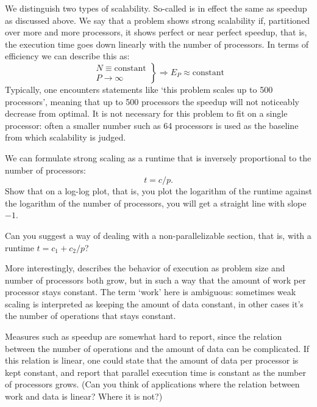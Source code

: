 We distinguish two types of scalability.
So-called
is in effect the same as speedup
as discussed above.
We say that a problem shows strong scalability if,
partitioned over more and more processors, it shows perfect or near
perfect speedup, that is, the execution time goes down linearly with
the number of processors. In terms of efficiency we can describe this
as:
\[ \left.
\begin{array}{l}
  N\equiv\mathrm{constant}\\ P\rightarrow\infty
\end{array}
\right\} \Rightarrow E_P\approx\mathrm{constant}
\]
Typically, one encounters statements like `this
problem scales up to 500 processors', meaning that up to 500
processors the speedup will not noticeably decrease from optimal. It
is not necessary for this problem to fit on a single processor: often
a smaller number such as 64 processors is used as the baseline from
which scalability is judged.

\begin{exercise}
  We can formulate strong scaling as a runtime that is inversely
  proportional to the number of processors: \[ t=c/p. \]
  Show that on a log-log plot, that is, you plot the logarithm of the
  runtime against the logarithm of the number of processors,
  you will get a straight line with slope~$-1$.

  Can you suggest a way of dealing with a non-parallelizable
  section, that is, with a runtime $t=c_1+c_2/p$?
\end{exercise}

More interestingly,
describes the behavior of execution
as problem size and number of processors both grow,
but in such a way that the amount of work per processor
stays constant. 
The term `work' here is ambiguous:
sometimes weak scaling is interpreted as keeping the
amount of data constant, in other cases it's the
number of operations that stays constant.

Measures such as speedup are somewhat hard to report, since
the relation between the number of operations and the amount of data
can be complicated. If this relation is linear, one could state that
the amount of data per processor is kept constant, and report that parallel
execution time is constant as the number of processors grows.
(Can you think of applications where the relation between work and
data is linear? Where it is not?)

